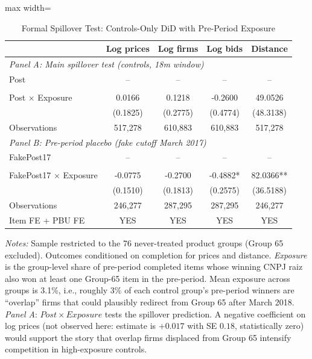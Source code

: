 \begin{table}[htbp]
\centering
\caption{Formal Spillover Test: Controls-Only DiD with Pre-Period Exposure}
\label{tab:spillover}
\begin{adjustbox}{max width=\textwidth}
\begin{threeparttable}
\small
\begin{tabular}{lcccc}
\toprule
 & Log prices & Log firms & Log bids & Distance \\
\midrule
\multicolumn{5}{l}{\textit{Panel A: Main spillover test (controls, 18m window)}} \\
Post & -- & -- & -- & -- \\
 &  &  &  &  \\
Post $\times$ Exposure & 0.0166 & 0.1218 & -0.2600 & 49.0526 \\
 & (0.1825) & (0.2775) & (0.4774) & (48.3138) \\
Observations & 517,278 & 610,883 & 610,883 & 517,278 \\
\midrule
\multicolumn{5}{l}{\textit{Panel B: Pre-period placebo (fake cutoff March 2017)}} \\
FakePost17 & -- & -- & -- & -- \\
 &  &  &  &  \\
FakePost17 $\times$ Exposure & -0.0775 & -0.2700 & -0.4882* & 82.0366** \\
 & (0.1510) & (0.1813) & (0.2575) & (36.5188) \\
Observations & 246,277 & 287,295 & 287,295 & 246,277 \\
\midrule
Item FE + PBU FE & YES & YES & YES & YES \\
\bottomrule
\end{tabular}
\begin{tablenotes}
\small
\item \textit{Notes:} Sample restricted to the 76 never-treated product groups
(Group 65 excluded). Outcomes conditioned on completion for prices and distance.
\textit{Exposure} is the group-level share of pre-period completed items
whose winning CNPJ raiz also won at least one Group-65 item in the pre-period.
Mean exposure across groups is 3.1\%, i.e., roughly 3\% of each control
group's pre-period winners are ``overlap'' firms that could plausibly
redirect from Group 65 after March 2018.
\textit{Panel A}: $Post \times Exposure$ tests the spillover prediction. A
negative coefficient on log prices (not observed here: estimate is $+0.017$
with SE $0.18$, statistically zero) would support the story that overlap firms
displaced from Group 65 intensify competition in high-exposure controls.

\end{tablenotes}
\end{threeparttable}
\end{adjustbox}
\end{table}
